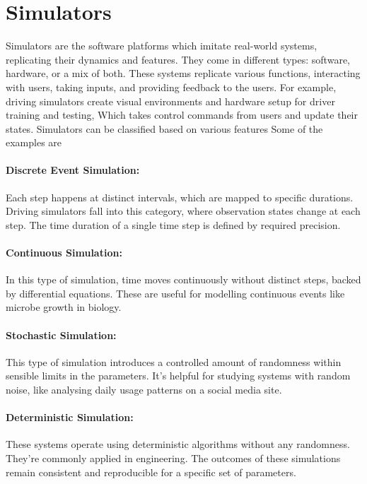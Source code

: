 \documentclass[12pt,twoside,a4paper,parskip]{scrbook} %
\begin{document}
\section{Simulators}
Simulators are the software platforms which imitate real-world systems, replicating their dynamics and features. They come in different types: software, hardware, or a mix of both. These systems replicate various functions, interacting with users, taking inputs, and providing feedback to the users. For example, driving simulators create visual environments and hardware setup for driver training and testing, Which takes control commands from users and update their states. Simulators can be classified based on various features Some of the examples are
\paragraph*{Discrete Event Simulation:}
Each step happens at distinct intervals, which are mapped to specific durations. Driving simulators fall into this category, where observation states change at each step. The time duration of a single time step is defined by required precision.
\paragraph*{Continuous Simulation:} In this type of simulation, time moves continuously without distinct steps, backed by differential equations. These are useful for modelling continuous events like microbe growth in biology.
\paragraph*{Stochastic Simulation:}
This type of simulation introduces a controlled amount of randomness within sensible limits in the parameters. It's helpful for studying systems with random noise, like analysing daily usage patterns on a social media site.
\paragraph*{Deterministic Simulation:}
These systems operate using deterministic algorithms without any randomness. They're commonly applied in engineering. The outcomes of these simulations remain consistent and reproducible for a specific set of parameters.
\end{document}
